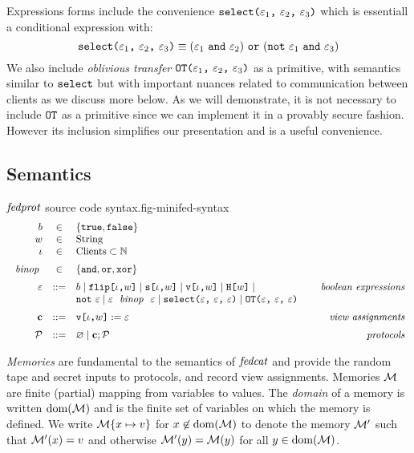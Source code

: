 Expressions forms include the convenience
$\texttt{select(} \varepsilon_1 \texttt{,}\ \varepsilon_2 \texttt{,}\ \varepsilon_3 \texttt{)}$ which is essentiall a conditional
expression with:
$$
\texttt{select(} \varepsilon_1 \texttt{,}\ \varepsilon_2 \texttt{,}\ \varepsilon_3 \texttt{)} \equiv (\varepsilon_1\ \texttt{and}\ \varepsilon_2)\ \texttt{or}\ (\texttt{not}\ \varepsilon_1\ \texttt{and}\ \varepsilon_3)
$$
We also include \emph{oblivious transfer} $\texttt{OT(} \varepsilon_1 \texttt{,}\ \varepsilon_2 \texttt{,}\ \varepsilon_3 \texttt{)}$ as a primitive,
with semantics similar to $\texttt{select}$ but with important nuances
related to communication between clients as we discuss more below.
As we will demonstrate, it is not necessary to include $\texttt{OT}$
as a primitive since we can implement it in a provably secure
fashion. However its inclusion simplifies our presentation and is a useful
convenience.

\subsection{Semantics}

\begin{fpfig}[t]{$\mathit{fedprot}$ source code syntax.}{fig-minifed-syntax}
$$
\begin{array}{rcl@{\hspace{8mm}}r}
b &\in& \{ \etrue, \efalse \} \\
w &\in& \mathrm{String} \\ 
\cid &\in& \mathrm{Clients} \subset  \mathbb{N} \\[2mm]%
\bop &\in& \{ \eand, \eor, \exor \} \\[2mm]
\be &::=& b \mid \flip{\cid}{w} \mid \secret{\cid}{w} \mid \view{\cid}{w} \mid \oracle{w} \mid & \textit{boolean expressions}\\
& &  \enot\ \be \mid \be\ \bop\ \be \mid \select{\be}{\be}{\be} \mid \OT{\be}{\be}{\be} \\[2mm]
\instr &::=& \eassign{\view{\cid}{w}}{\be} & \textit{view assignments} \\[2mm]
\prog &::=& \varnothing \mid \instr; \prog & \textit{protocols}
\end{array}
$$ 
\end{fpfig}

\emph{Memories} are fundamental to the semantics of $\mathit{fedcat}$ and
provide the random tape and secret inputs to protocols, and record
view assignments. Memories $\mathcal{M}$ are finite (partial) mapping from
variables to values. The \emph{domain} of a memory is written
$\mathrm{dom}(\mathcal{M})$ and is the finite set of variables on which the memory
is defined. We write $\mathcal{M}\{ x \mapsto v\}$ for
$x\not\in\mathrm{dom}(\mathcal{M})$ to denote the memory $\mathcal{M}'$ such that
$\mathcal{M}'(x) = v$ and otherwise $\mathcal{M}'(y) = \mathcal{M}(y)$ for all $y \in
\mathrm{dom}(\mathcal{M})$. 

